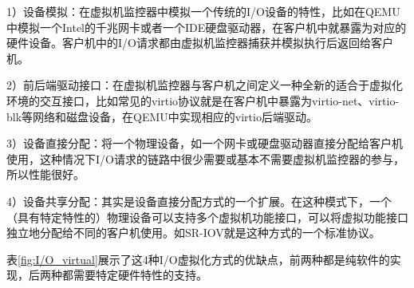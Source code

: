 1）设备模拟：在虚拟机监控器中模拟一个传统的I/O设备的特性，比如在QEMU中模拟一个Intel的千兆网卡或者一个IDE硬盘驱动器，在客户机中就暴露为对应的硬件设备。客户机中的I/O请求都由虚拟机监控器捕获并模拟执行后返回给客户机。

2）前后端驱动接口：在虚拟机监控器与客户机之间定义一种全新的适合于虚拟化环境的交互接口，比如常见的virtio协议就是在客户机中暴露为virtio-net、virtio-blk等网络和磁盘设备，在QEMU中实现相应的virtio后端驱动。

3）设备直接分配：将一个物理设备，如一个网卡或硬盘驱动器直接分配给客户机使用，这种情况下I/O请求的链路中很少需要或基本不需要虚拟机监控器的参与，所以性能很好。

4）设备共享分配：其实是设备直接分配方式的一个扩展。在这种模式下，一个（具有特定特性的）物理设备可以支持多个虚拟机功能接口，可以将虚拟功能接口独立地分配给不同的客户机使用。如SR-IOV就是这种方式的一个标准协议。

表\ref{fig:I/O_virtual}展示了这4种I/O虚拟化方式的优缺点，前两种都是纯软件的实现，后两种都需要特定硬件特性的支持。

